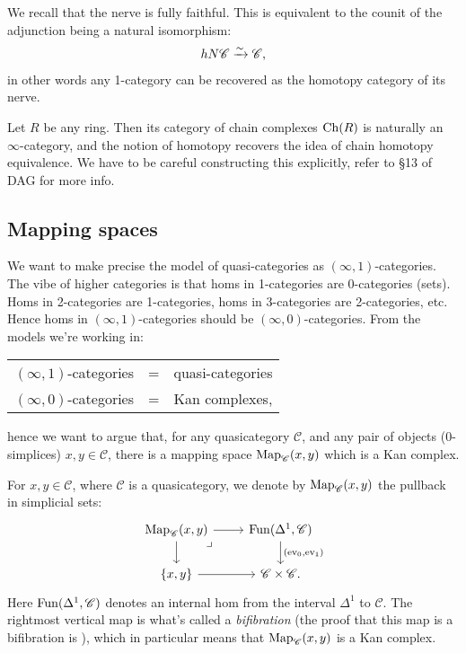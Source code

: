 \documentclass[11pt]{amsart}
\begin{document}
\begin{remark} We recall that the nerve is fully faithful. This is equivalent to the counit of the adjunction being a natural isomorphism:
\begin{align*}
    hN\mathscr{C} \xrightarrow{\sim} \mathscr{C},
\end{align*}
in other words any 1-category can be recovered as the homotopy category of its nerve.
\end{remark}

\begin{example} Let $R$ be any ring. Then its category of chain complexes $\mathrm{Ch}(R)$ is naturally an $\infty$-category, and the notion of homotopy recovers the idea of chain homotopy equivalence. We have to be careful constructing this explicitly, refer to \S13 of DAG for more info.
\end{example}


\subsection{Mapping spaces}


We want to make precise the model of quasi-categories as $(\infty,1)$-categories. The vibe of higher categories is that homs in 1-categories are 0-categories (sets). Homs in 2-categories are 1-categories, homs in 3-categories are 2-categories, etc. Hence homs in $(\infty,1)$-categories should be $(\infty,0)$-categories. From the models we're working in:

\begin{center} 
\begin{tabular}{l  l  l}
$(\infty,1)$-categories & = & quasi-categories \\
$(\infty,0)$-categories & = & Kan complexes,
\end{tabular}
\end{center}
hence we want to argue that, for any quasicategory $\mathscr{C}$, and any pair of objects (0-simplices) $x,y\in \mathscr{C}$, there is a mapping space $\mathrm{Map}_\mathscr{C}(x,y)$ which is a Kan complex.



\begin{definition} For $x,y\in \mathscr{C}$, where $\mathscr{C}$ is a quasicategory, we denote by $\mathrm{Map}_{\mathscr{C}}(x,y)$ the pullback in simplicial sets:
\[ \begin{tikzcd}
    {\Map_{\mathscr{C}}(x,y)}\rar\dar\pb & {\Fun(\Delta^1,\mathscr{C})}\dar["{(\ev_0,\ev_1)}" right]\\
    {\{x,y\}}\rar & \mathscr{C} \times \mathscr{C}.
\end{tikzcd} \]
Here $\mathrm{Fun}(\Delta^1,\mathscr{C})$ denotes an internal hom from the interval $\Delta^1$ to $\mathscr{C}$. The rightmost vertical map is what's called a \textit{bifibration} (the proof that this map is a bifibration is \cite[2.4.7.11]{HTT}), which in particular means that $\mathrm{Map}_{\mathscr{C}}(x,y)$ is a Kan complex.
\end{definition}
\end{document}
